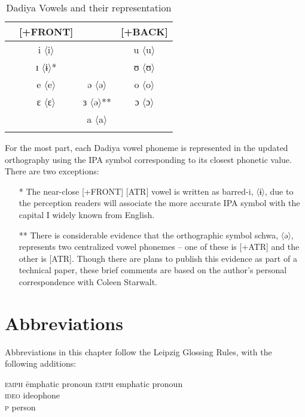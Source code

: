 \documentclass[output=paper]{langscibook}
\begin{document}
\begin{table}
\caption{Dadiya Vowels and their representation}
\begin{tabular}{lccc}
\lsptoprule
{} & [+FRONT] & {} & [+BACK] \\\midrule\relax
[+ATR] & i	〈i〉\hphantom{*} & {} & u	〈u〉 \\ & ɪ	〈ɨ〉* & {} & ʊ	〈ʊ〉 \\\relax
[+ATR]          & e	〈e〉\hphantom{*}  & ə	〈ə〉\hphantom{**} & o	〈o〉 \\ & ɛ	〈ɛ〉\hphantom{*} & ɜ	〈ə〉** & ɔ	〈ɔ〉 \\ & {}    & a	〈a〉\hphantom{**} & {} \\
\lspbottomrule
\end{tabular}
\end{table}

\noindent For the most part, each Dadiya vowel phoneme is represented in the updated orthography \citep{Committee2018} using the IPA symbol corresponding to its closest phonetic value. There are two exceptions:

\begin{itemize}
\item[*] The near-close [+FRONT] [\textminus ATR] vowel is written as barred-i,  〈ɨ〉, due to the perception readers will associate the more accurate IPA symbol with the capital I widely known from English.
\item[**] There is considerable evidence that the orthographic symbol schwa, 〈ə〉, represents two centralized vowel phonemes -- one of these is [+ATR] and the other is [\textminus ATR]. Though there are plans to publish this evidence as part of a technical paper, these brief comments are based on the author's personal correspondence with Coleen Starwalt.
\end{itemize}

\section*{Abbreviations}

Abbreviations in this chapter follow the Leipzig Glossing Rules, with the following additions:

\begin{tabbing}
\textsc{emph}\hspace{1ex} \= emphatic pronoun\kill
\textsc{emph} \> emphatic pronoun\\
\textsc{ideo} \> ideophone\\
\textsc{p}    \> person\\
\end{tabbing}

{\sloppy\printbibliography[heading=subbibliography,notkeyword=this]}
\end{document}
